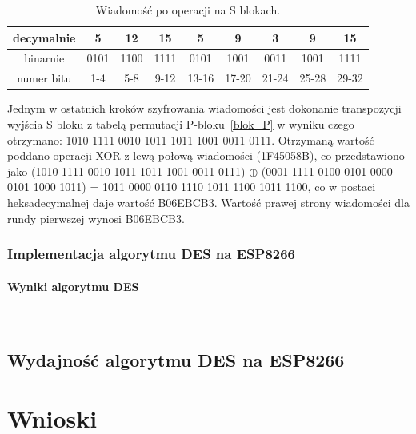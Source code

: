\documentclass[12p]{article}
\begin{document}
\begin{table}[H]
\centering
\begin{tabular}{|c|c|c|c|c|c|c|c|c|} 
\hline
decymalnie &5 &12& 15& 5& 9& 3& 9& 15\\ \hline
binarnie & 0101& 1100& 1111& 0101& 1001& 0011& 1001& 1111\\ \hline
numer bitu &1-4 &5-8& 9-12& 13-16& 17-20& 21-24& 25-28& 29-32\\ \hline
\end{tabular}
\caption{Wiadomość po operacji na S blokach.}\label{sbok_wynik}
\end{table}

Jednym w ostatnich kroków szyfrowania wiadomości jest dokonanie transpozycji wyjścia S bloku z tabelą permutacji P-bloku~\ref{blok_P} w wyniku czego otrzymano: 1010 1111 0010 1011 1011 1001 0011 0111. Otrzymaną wartość poddano operacji XOR z lewą połową wiadomości (1F45058B), co przedstawiono jako (1010 1111 0010 1011 1011 1001 0011 0111) $\oplus$ (0001 1111 0100 0101 0000 0101 1000 1011) = 1011 0000 0110 1110 1011 1100 1011 1100, co w postaci heksadecymalnej daje wartość B06EBCB3. Wartość prawej strony wiadomości dla rundy pierwszej wynosi B06EBCB3. 

\subsubsection{Implementacja algorytmu DES na ESP8266}



\paragraph{Wyniki algorytmu DES}\mbox{} \\


\subsection{Wydajność algorytmu DES na ESP8266} 
\newpage
\section{Wnioski}
\end{document}
